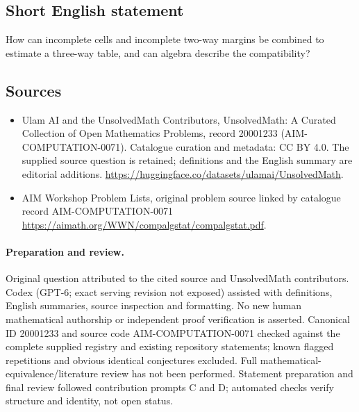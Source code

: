 \documentclass[11pt]{article}
\begin{document}
\subsection{Short English statement}
How can incomplete cells and incomplete two-way margins be combined to estimate a three-way table, and can algebra describe the compatibility?
\subsection{Sources}
\begin{itemize}
\item[\hypertarget{source:20001233:1}{S1}] Ulam AI and the UnsolvedMath Contributors, UnsolvedMath: A Curated Collection of Open Mathematics Problems, record 20001233 (AIM-COMPUTATION-0071). Catalogue curation and metadata: CC BY 4.0. The supplied source question is retained; definitions and the English summary are editorial additions.
\url{https://huggingface.co/datasets/ulamai/UnsolvedMath}.
\item[\hypertarget{source:20001233:2}{S2}] AIM Workshop Problem Lists, original problem source linked by catalogue record AIM-COMPUTATION-0071
\url{https://aimath.org/WWN/compalgstat/compalgstat.pdf}.
\end{itemize}
\paragraph{Preparation and review.}
Original question attributed to the cited source and UnsolvedMath contributors. Codex (GPT-6; exact serving revision not exposed) assisted with definitions, English summaries, source inspection and formatting. No new human mathematical authorship or independent proof verification is asserted. Canonical ID 20001233 and source code AIM-COMPUTATION-0071 checked against the complete supplied registry and existing repository statements; known flagged repetitions and obvious identical conjectures excluded. Full mathematical-equivalence/literature review has not been performed. Statement preparation and final review followed contribution prompts C and D; automated checks verify structure and identity, not open status.
\label{end:20001233}
\end{document}
